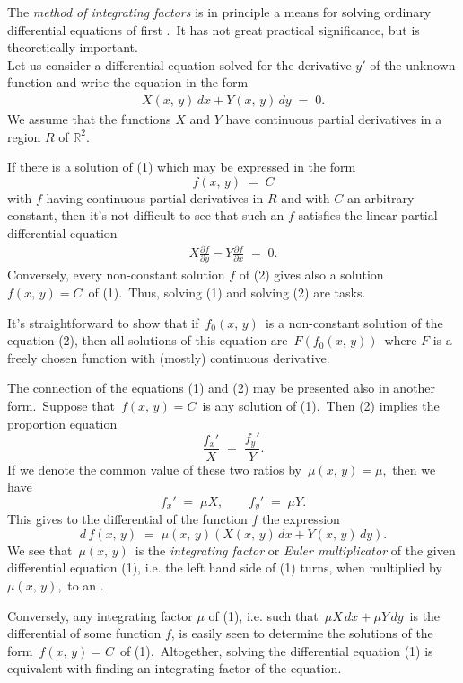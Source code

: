 \documentclass[12pt]{article}
\theoremstyle{definition}
\begin{document}
 

The {\em method of integrating factors} is in principle a means for solving ordinary differential equations of first .\, It has not great practical significance, but is theoretically important.\\

Let us consider a differential equation solved for the derivative $y'$ of the unknown function and write the equation in the form
\begin{align}
  X(x,\,y)\,dx+Y(x,\,y)\,dy \;=\; 0.
\end{align}
We assume that the functions $X$ and $Y$ have continuous partial derivatives in a region $R$ of $\mathbb{R}^2$.

If there is a solution of (1) which may be expressed in the form
  $$f(x,\,y) \;=\; C$$
with $f$ having continuous partial derivatives in $R$ and with $C$ an arbitrary constant, then it's not difficult to see that such an $f$ satisfies the linear partial differential equation
\begin{align}
  X\frac{\partial f}{\partial y}-Y\frac{\partial f}{\partial x} \;=\; 0.
\end{align}
Conversely, every non-constant solution $f$ of (2) gives also a solution\, $f(x,\,y) = C$\, of (1).\, Thus, solving (1) and solving (2) are  tasks.

It's straightforward to show that if\, $f_0(x,\,y)$\, is a non-constant solution of the equation (2), then all solutions of this equation are\, $F(f_0(x,\,y))$\, where $F$ is a freely chosen function with (mostly) continuous derivative.

The connection of the equations (1) and (2) may be presented also in another form.\, Suppose that\, $f(x,\,y) = C$\, is any solution of (1).\, Then (2) implies  the proportion equation
  $$\frac{f_x'}{X} \;=\; \frac{f_y'}{Y}.$$
If we denote the common value of these two ratios by\, $\mu(x,\,y) = \mu$,\, then we have
  $$f_x' \;=\; \mu X, \qquad  f_y' \;=\; \mu Y.$$
This gives to the differential of the function $f$ the expression
  $$d\,f(x,\,y) \;=\; \mu(x,\,y)(X(x,\,y)\,dx+Y(x,\,y)\,dy).$$
We see that\, $\mu(x,\,y)$\, is the {\em integrating factor} or {\em Euler multiplicator} of the given differential equation (1), i.e. the left hand side of (1) turns, when multiplied by\, $\mu(x,\,y)$,\, to an .

Conversely, any integrating factor $\mu$ of (1), i.e. such that\, 
$\mu X\,dx+\mu Y\,dy$\, is the differential of some function $f$, is easily seen to determine the solutions of the form\, $f(x,\,y) = C$\, of (1).\, Altogether, solving the differential equation (1) is equivalent with finding an integrating factor of the equation.
\end{document}
